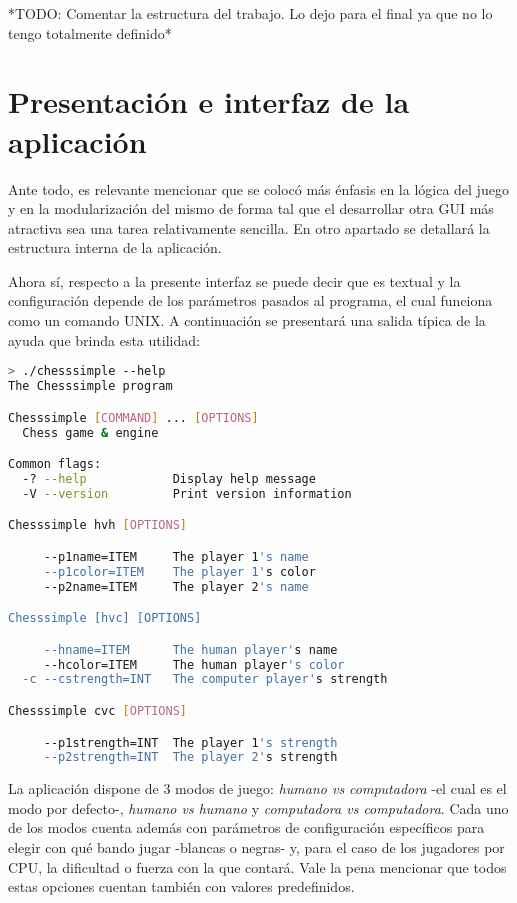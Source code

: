 \documentclass{llncs}
\begin{document}
*TODO: Comentar la estructura del trabajo. Lo dejo para el final ya que no lo tengo totalmente definido*

\section{Presentación e interfaz de la aplicación}

Ante todo, es relevante mencionar que se colocó más énfasis en la lógica del juego y en la modularización del mismo de forma tal que el desarrollar otra GUI más atractiva sea una tarea relativamente sencilla. En otro apartado se detallará la estructura interna de la aplicación.

Ahora sí, respecto a la presente interfaz se puede decir que es textual y la configuración depende de los parámetros pasados al programa, el cual funciona como un comando UNIX. A continuación se presentará una salida típica de la ayuda que brinda esta utilidad:

\begin{lstlisting}[frame=single, language=bash, caption=Ayuda de la aplicación, label={lst:ayuda_programa}]
> ./chesssimple --help
The Chesssimple program

Chesssimple [COMMAND] ... [OPTIONS]
  Chess game & engine

Common flags:
  -? --help            Display help message
  -V --version         Print version information

Chesssimple hvh [OPTIONS]

     --p1name=ITEM     The player 1's name
     --p1color=ITEM    The player 1's color
     --p2name=ITEM     The player 2's name

Chesssimple [hvc] [OPTIONS]

     --hname=ITEM      The human player's name
     --hcolor=ITEM     The human player's color
  -c --cstrength=INT   The computer player's strength

Chesssimple cvc [OPTIONS]

     --p1strength=INT  The player 1's strength
     --p2strength=INT  The player 2's strength
\end{lstlisting}

La aplicación dispone de 3 modos de juego: \textit{humano vs computadora} -el cual es el modo por defecto-, \textit{humano vs humano} y \textit{computadora vs computadora}. Cada uno de los modos cuenta además con parámetros de configuración específicos para elegir con qué bando jugar -blancas o negras- y, para el caso de los jugadores por CPU, la dificultad o fuerza con la que contará. Vale la pena mencionar que todos estas opciones cuentan también con valores predefinidos.
\end{document}
